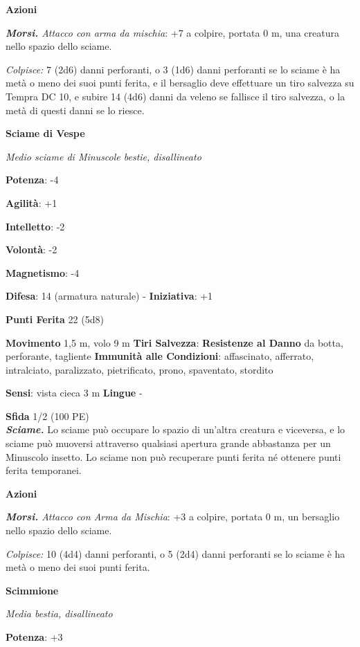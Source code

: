 \begin{multicols}{2}
\smallskip\textbf{Azioni}

\emph{\textbf{Morsi.} Attacco con arma da mischia}: +7 a colpire,
portata 0 m, una creatura nello spazio dello sciame.

\emph{Colpisce:} 7 (2d6) danni perforanti, o 3 (1d6) danni perforanti se
lo sciame è ha metà o meno dei suoi punti ferita, e il bersaglio deve
effettuare un tiro salvezza su Tempra DC 10, e subire 14 (4d6)
danni da veleno se fallisce il tiro salvezza, o la metà di questi danni
se lo riesce.

\textbf{Sciame di Vespe}

\emph{Medio sciame di Minuscole bestie, disallineato}

\textbf{Potenza}: -4

\textbf{Agilità}: +1

\textbf{Intelletto}: -2

\textbf{Volontà}: -2

\textbf{Magnetismo}: -4

\textbf{Difesa}: 14 (armatura naturale) - \textbf{Iniziativa}: +1

\textbf{Punti Ferita} 22 (5d8)

\textbf{Movimento} 1,5 m, volo 9 m
\textbf{Tiri Salvezza}:
\textbf{Resistenze al Danno} da botta, perforante, tagliente
\textbf{Immunità alle Condizioni}: affascinato, afferrato, intralciato,
paralizzato, pietrificato, prono, spaventato, stordito

\textbf{Sensi}: vista cieca 3 m \textbf{Lingue} -

\textbf{Sfida} 1/2 (100 PE)\smallskip\\

\emph{\textbf{Sciame.}} Lo sciame può occupare lo spazio di un'altra
creatura e viceversa, e lo sciame può muoversi attraverso qualsiasi
apertura grande abbastanza per un Minuscolo insetto. Lo sciame non può
recuperare punti ferita né ottenere punti ferita temporanei.

\smallskip\textbf{Azioni}

\emph{\textbf{Morsi.} Attacco con Arma da Mischia}: +3 a colpire,
portata 0 m, un bersaglio nello spazio dello sciame.

\emph{Colpisce:} 10 (4d4) danni perforanti, o 5 (2d4) danni perforanti
se lo sciame è ha metà o meno dei suoi punti ferita.

\textbf{Scimmione}

\emph{Media bestia, disallineato}

\textbf{Potenza}: +3


\end{multicols}
